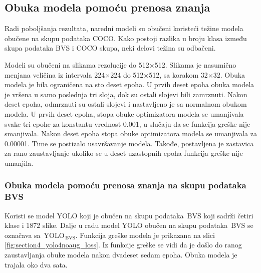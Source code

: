 \documentclass[12pt,oneside]{memoir}
\newcommand{\yolo}{\ensuremath{\,\textrm{YOLO}}}
\newcommand{\bvs}{\ensuremath{\,\textrm{BVS}}}
\begin{document}
\subsection{Obuka modela pomoću prenosa znanja}
Radi poboljšanja rezultata, naredni modeli su obučeni koristeći težine modela obučene na skupu podataka COCO. Kako postoji razlika u broju klasa između skupa podataka BVS i COCO skupa, neki delovi težina su odbačeni.

Modeli su obučeni na slikama rezolucije do 512$\times$512. Slikama je nasumično menjana veličina iz intervala 224$\times$224 do 512$\times$512, sa korakom 32$\times$32. Obuka modela je bila ograničena na sto deset epoha. U prvih deset epoha obuka modela je vršena u samo poslednja tri sloja, dok su ostali slojevi bili zamrznuti. Nakon deset epoha, odmrznuti su ostali slojevi i nastavljeno je sa normalnom obukom modela. U prvih deset epoha, stopa obuke optimizatora modela se umanjivala svake tri epohe za konstantu vrednost 0.001, u slučaju da se funkcija greške nije smanjivala. Nakon deset epoha stopa obuke optimizatora modela se umanjivala za 0.00001. Time se postizalo usavršavanje modela. Takođe, postavljena je zastavica za rano zaustavljanje ukoliko se u deset uzastopnih epoha funkcija greške nije umanjila.


\subsubsection{Obuka modela pomoću prenosa znanja na skupu podataka BVS}
Koristi se model YOLO koji je obučen na skupu podataka \bvs{} koji sadrži četiri klase i 1872 slike. Dalje u radu model YOLO obučen na skupu podataka \bvs{} se označava sa $\yolo_{\bvs}$. Funkcija greške modela je prikazana na slici \ref{fig:section4_yolo4noaug_loss}. Iz funkcije greške se vidi da je došlo do ranog zaustavljanja obuke modela nakon dvadeset sedam epoha. Obuka modela je trajala oko dva sata.
\end{document}
